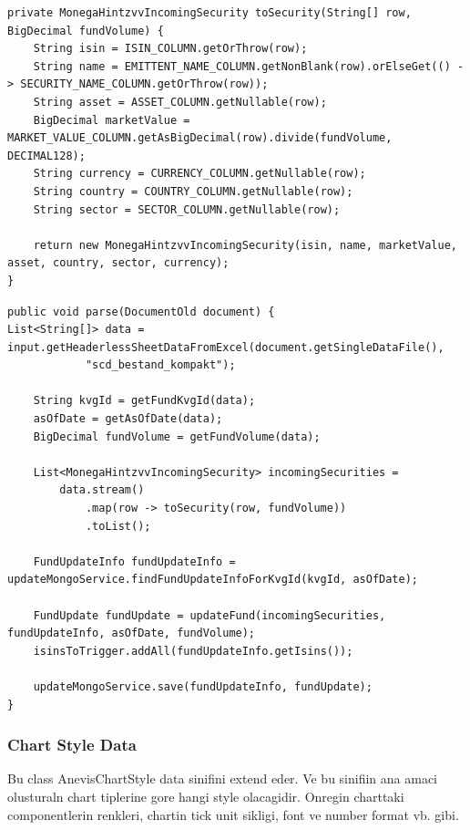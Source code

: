 \begin{lstlisting}[caption={Incoming Security}]
private MonegaHintzvvIncomingSecurity toSecurity(String[] row, BigDecimal fundVolume) {
	String isin = ISIN_COLUMN.getOrThrow(row);
	String name = EMITTENT_NAME_COLUMN.getNonBlank(row).orElseGet(() -> SECURITY_NAME_COLUMN.getOrThrow(row));
	String asset = ASSET_COLUMN.getNullable(row);
	BigDecimal marketValue = MARKET_VALUE_COLUMN.getAsBigDecimal(row).divide(fundVolume, DECIMAL128);
	String currency = CURRENCY_COLUMN.getNullable(row);
	String country = COUNTRY_COLUMN.getNullable(row);
	String sector = SECTOR_COLUMN.getNullable(row);

	return new MonegaHintzvvIncomingSecurity(isin, name, marketValue, asset, country, sector, currency);
}

\end{lstlisting}

\begin{lstlisting}[caption={method}]
public void parse(DocumentOld document) {
List<String[]> data = input.getHeaderlessSheetDataFromExcel(document.getSingleDataFile(),
			"scd_bestand_kompakt");

	String kvgId = getFundKvgId(data);
	asOfDate = getAsOfDate(data);
	BigDecimal fundVolume = getFundVolume(data);

	List<MonegaHintzvvIncomingSecurity> incomingSecurities = 
        data.stream()
            .map(row -> toSecurity(row, fundVolume))
            .toList();

	FundUpdateInfo fundUpdateInfo = updateMongoService.findFundUpdateInfoForKvgId(kvgId, asOfDate);

	FundUpdate fundUpdate = updateFund(incomingSecurities, fundUpdateInfo, asOfDate, fundVolume);
	isinsToTrigger.addAll(fundUpdateInfo.getIsins());

	updateMongoService.save(fundUpdateInfo, fundUpdate);
}
\end{lstlisting}

\subsubsection{Chart Style Data}
Bu class AnevisChartStyle data sinifini extend eder. Ve bu sinifiin ana amaci olusturaln chart tiplerine gore hangi style olacagidir. 
Onregin charttaki componentlerin renkleri, chartin tick unit sikligi, font ve number format vb. gibi.

